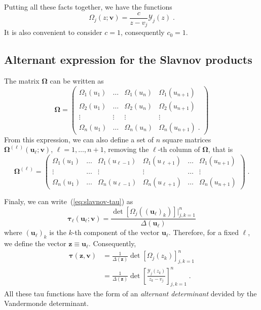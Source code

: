 \documentclass[a4paper,12pt]{amsart}
\begin{document}
Putting all these facts together, we have the functions
\begin{equation}
  \Omega_{j}(z; \bm{v}) = \frac{c}{z - v_j} \mathcal{Y}_j(z) \; .
\end{equation}
It is also convenient to consider \(c=1\), consequently \(c_0=1\).



\subsection{Alternant expression for the Slavnov products}

The matrix \(\bm{\Omega}\) can be written as
\begin{equation}
  \bm{\Omega} =
  \begin{pmatrix}
    \Omega_1(u_1) & \dots & \Omega_1(u_n) & \Omega_1(u_{n+1}) \\
    \Omega_2(u_1) & \dots & \Omega_2(u_n) & \Omega_2(u_{n+1}) \\
    \vdots & \vdots & \vdots & \vdots \\
    \Omega_n(u_1) & \dots & \Omega_n(u_n) & \Omega_n(u_{n+1})\; .
  \end{pmatrix}
\end{equation}
From this expression, we can also define a set of \(n\) square matrices
\(\bm\Omega^{(\ell)}(\bm{u}_\ell; \bm{v})\),
\(\ell = 1, \dots, n+1\), removing the \(\ell\)-th column of
\(\bm{\Omega}\), that is
\begin{equation}
  \bm{\Omega}^{(\ell)} =
  \begin{pmatrix}
    \Omega_1(u_1) & \dots & \Omega_1(u_{\ell-1}) & \Omega_1(u_{\ell+1})&\dots & \Omega_1(u_{n+1}) \\
    \vdots & \dots & \vdots & \vdots & \dots & \vdots \\
    \Omega_n(u_1) & \dots & \Omega_n(u_{\ell-1}) & \Omega_n(u_{\ell+1})&\dots & \Omega_n(u_{n+1})
  \end{pmatrix}\; .
\end{equation}

Finaly, we can write~(\ref{eq:slavnov-tau}) as 
\begin{equation}
\label{eq:slavnov-tau-functions}
  \bm{\tau}_\ell(\bm{u}_\ell; \bm{v}) = \frac{\det [\Omega_j((\bm{u}_\ell)_k)]|_{j,k=1}^n }{\Delta(\bm{u}_\ell)} 
\end{equation}
where \((\bm{u}_\ell)_k \) is the \(k\)-th component of the vector
\(\bm{u}_\ell\).  Therefore, for a fixed \(\ell\), we define the
vector \( \bm{z} \equiv \bm{u}_\ell\).  Consequently,
\begin{equation}
\begin{split}
\label{eq:slav-tau-function}
  \bm{\tau}(\bm{z}, \bm{v})
  & = \frac{1}{\Delta(\bm{z})} \det[\Omega_j(z_k) ]_{j,k=1}^n \\
  & = \frac{1}{\Delta(\bm{z})} \det\left[\frac{\mathcal{Y}_j(z_k)}{z_k - v_j} \right]_{j,k=1}^n  \; .
\end{split}
\end{equation}
All these tau functions have the form of an \emph{alternant
determinant} devided by the Vandermonde determinant.
\end{document}

